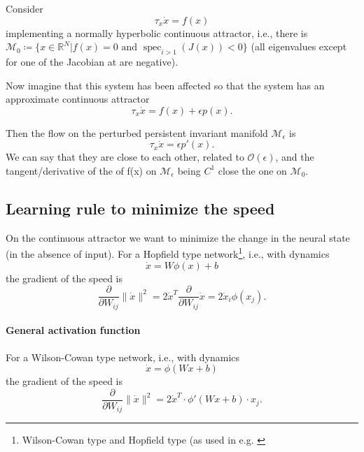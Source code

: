 \documentclass{article}
\theoremstyle{definition} \newtheorem{definition}{Definition}
\theoremstyle{remark} \newtheorem{remark}{Remark}
\newcommand{\reals}{\mathbb{R}}
\newcommand{\manifold}{\mathcal{M}}
\newcommand{\spec}{\operatorname{spec}}
\newcounter{ct}
\begin{document}
Consider 
\begin{equation}\label{eq:ode}
\tau_x\dot x = f(x) 
\end{equation}
implementing a normally hyperbolic continuous attractor, i.e., there is $\manifold_0\coloneqq \{x \in \reals^N | f(x) = 0 \text{ and } \spec_{i>1}(J(x)) <0\}$  (all eigenvalues except for one of the Jacobian at are negative). 

Now imagine that this system has been affected so that the system has an approximate continuous attractor
\begin{equation}\label{eq:ode_pert}
\tau_x\dot x = f(x)  + \epsilon p(x).
\end{equation}

Then the flow on the perturbed persistent invariant manifold $\manifold_\epsilon$ is
\begin{equation}\label{eq:ode_pert}
\tau_x\dot x = \epsilon p'(x).
\end{equation}
We can say that they are close to each other, related to $\mathcal{O}(\epsilon)$, and the tangent/derivative of the of f(x) on $\manifold_\epsilon$ being $C^1$ close the one on $\manifold_0$.




\subsection{Learning rule to minimize the speed}%
On the continuous attractor we want to minimize the change in the neural state (in the absence of input).
For a Hopfield type network\footnote{Wilson-Cowan type and Hopfield type (as used in e.g. \citep{gort2024emergence}}, i.e., with dynamics 
\begin{equation}\label{sec:hopfieldode}
\dot x = W\phi(x) + b
\end{equation}
 the gradient of the speed is
\begin{equation}
\frac{\partial}{\partial W_{ij}}\|\dot x \|^2 = 2 \dot x^T \frac{\partial}{\partial W_{ij}}\dot x = 2 \dot x_i\phi(x_j).
\end{equation}



\paragraph{General activation function}
For a Wilson-Cowan type network, i.e., with dynamics 
\begin{equation}
\dot x = \phi(Wx+b) 
\end{equation}
 the gradient of the speed is
\begin{equation}
\frac{\partial}{\partial W_{ij}} \|\dot{x}\|^2 = 2 \dot{x}^T \cdot \phi'(Wx+b) \cdot x_j.
\end{equation}
\end{document}
